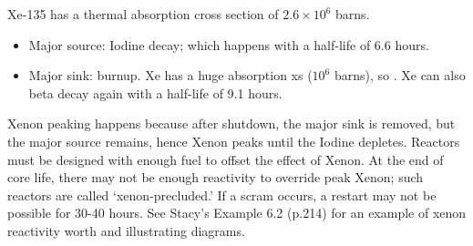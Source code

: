 \documentclass{school-22.211-notes}
\begin{document}
\clearpage
{} \label{FP-Xenon}
Xe-135 has a thermal absorption cross section of $2.6\times 10^6$ barns. 
\begin{itemize}
\item Major source: Iodine decay;  which happens with a half-life of 6.6 hours.
\item Major sink: burnup. Xe has a huge absorption xs ($10^6$ barns), so . Xe can also beta decay again with a half-life of 9.1 hours. 
\end{itemize}
Xenon peaking happens because after shutdown, the major sink is removed, but the major source remains, hence Xenon peaks until the Iodine depletes. Reactors must be designed with enough fuel to offset the effect of Xenon. At the end of core life, there may not be enough reactivity to override peak Xenon; such reactors are called `xenon-precluded.' If a scram occurs, a restart may not be possible for 30-40 hours. See Stacy's Example 6.2 (p.214) for an example of xenon reactivity worth and illustrating diagrams. 
\end{document}
